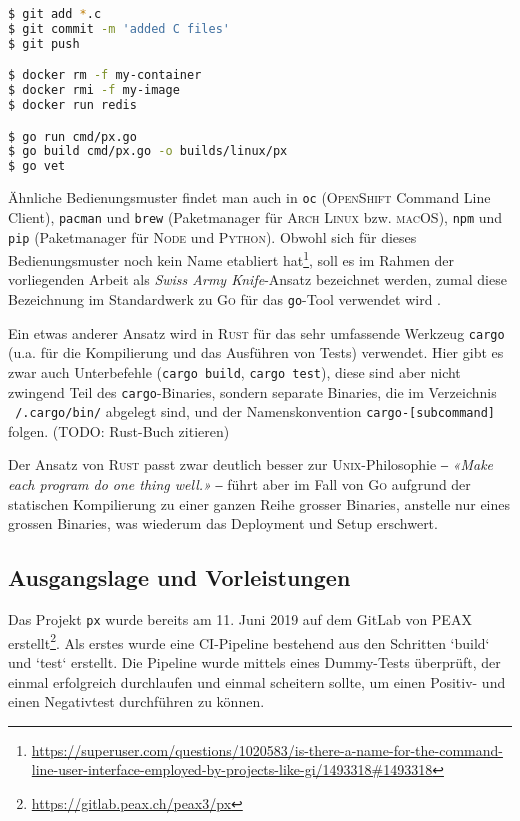 \begin{lstlisting}[language=bash,caption={Einie Kommandozeilenbeispiele mit Haupt- und Unterbefehl}]
$ git add *.c
$ git commit -m 'added C files'
$ git push

$ docker rm -f my-container
$ docker rmi -f my-image
$ docker run redis

$ go run cmd/px.go
$ go build cmd/px.go -o builds/linux/px
$ go vet
\end{lstlisting}

Ähnliche Bedienungsmuster findet man auch in \texttt{oc} (\textsc{OpenShift} Command Line Client), \texttt{pacman} und \texttt{brew} (Paketmanager für \textsc{Arch Linux} bzw. \textsc{macOS}), \texttt{npm} und \texttt{pip} (Paketmanager für \textsc{Node} und \textsc{Python}). Obwohl sich für dieses Bedienungsmuster noch kein Name etabliert hat\footnote{\url{https://superuser.com/questions/1020583/is-there-a-name-for-the-command-line-user-interface-employed-by-projects-like-gi/1493318\#1493318}}, soll es im Rahmen der vorliegenden Arbeit als \textit{Swiss Army Knife}-Ansatz bezeichnet werden, zumal diese Bezeichnung im Standardwerk zu \textsc{Go} für das \texttt{go}-Tool verwendet wird \cite{gopl}.

Ein etwas anderer Ansatz wird in \textsc{Rust} für das sehr umfassende Werkzeug \texttt{cargo} (u.a. für die Kompilierung und das Ausführen von Tests) verwendet. Hier gibt es zwar auch Unterbefehle (\texttt{cargo build}, \texttt{cargo test}), diese sind aber nicht zwingend Teil des \texttt{cargo}-Binaries, sondern separate Binaries, die im Verzeichnis \texttt{~/.cargo/bin/} abgelegt sind, und der Namenskonvention \texttt{cargo-[subcommand]} folgen. (TODO: Rust-Buch zitieren)

Der Ansatz von \textsc{Rust} passt zwar deutlich besser zur \textsc{Unix}-Philosophie ‒ \textit{«Make each program do one thing well.»} \cite[p. 3]{unixtimesharing} ‒ führt aber im Fall von \textsc{Go} aufgrund der statischen Kompilierung zu einer ganzen Reihe grosser Binaries, anstelle nur eines grossen Binaries, was wiederum das Deployment und Setup erschwert.

\subsection{Ausgangslage und Vorleistungen}

Das Projekt \texttt{px} wurde bereits am 11. Juni 2019 auf dem GitLab von PEAX erstellt\footnote{\url{https://gitlab.peax.ch/peax3/px}}. Als erstes wurde eine CI-Pipeline bestehend aus den Schritten `build` und `test` erstellt. Die Pipeline wurde mittels eines Dummy-Tests überprüft, der einmal erfolgreich durchlaufen und einmal scheitern sollte, um einen Positiv- und einen Negativtest durchführen zu können.


